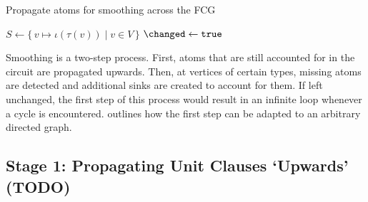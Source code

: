 \documentclass{article}
\theoremstyle{definition}
\begin{document}
\begin{algorithm}
  \caption{Propagate atoms for smoothing across the FCG}\label{alg:smoothing}
  $S \gets \{\, v \mapsto \iota(\tau(v)) \mid v \in V \,\}$\;
  $\changed \gets \texttt{true}$\;
\end{algorithm}

Smoothing is a two-step process. First, atoms that are still accounted for in
the circuit are propagated upwards. Then, at vertices of certain types, missing
atoms are detected and additional sinks are created to account for them. If left
unchanged, the first step of this process would result in an infinite loop
whenever a cycle is encountered.  outlines how the first
step can be adapted to an arbitrary directed graph.

\subsection{Stage 1: Propagating Unit Clauses `Upwards' (TODO)}
\end{document}
